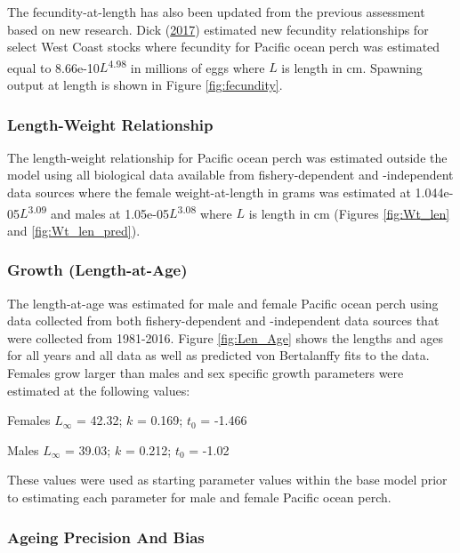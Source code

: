 \documentclass[12pt,]{article}
\begin{document}
The fecundity-at-length has also been updated from the previous
assessment based on new research. Dick
(\protect\hyperlink{ref-dick_meta-analysis_2017}{2017}) estimated new
fecundity relationships for select West Coast stocks where fecundity for
Pacific ocean perch was estimated equal to
8.66e-10\(L\)\textsuperscript{4.98} in millions of eggs where \(L\) is
length in cm. Spawning output at length is shown in Figure
\ref{fig:fecundity}.

\subsubsection{Length-Weight
Relationship}\label{length-weight-relationship}

The length-weight relationship for Pacific ocean perch was estimated
outside the model using all biological data available from
fishery-dependent and -independent data sources where the female
weight-at-length in grams was estimated at
1.044e-05\(L\)\textsuperscript{3.09} and males at
1.05e-05\(L\)\textsuperscript{3.08} where \(L\) is length in cm (Figures
\ref{fig:Wt_len} and \ref{fig:Wt_len_pred}).

\subsubsection{Growth (Length-at-Age)}\label{growth-length-at-age}

The length-at-age was estimated for male and female Pacific ocean perch
using data collected from both fishery-dependent and -independent data
sources that were collected from 1981-2016. Figure \ref{fig:Len_Age}
shows the lengths and ages for all years and all data as well as
predicted von Bertalanffy fits to the data. Females grow larger than
males and sex specific growth parameters were estimated at the following
values:

\begin{centering}

Females $L_{\infty}$ = 42.32; $k$ = 0.169; $t_0$ = -1.466

Males $L_{\infty}$ = 39.03; $k$ = 0.212; $t_0$ = -1.02

\end{centering}

These values were used as starting parameter values within the base
model prior to estimating each parameter for male and female Pacific
ocean perch.

\subsubsection{Ageing Precision And
Bias}\label{ageing-precision-and-bias}
\end{document}
